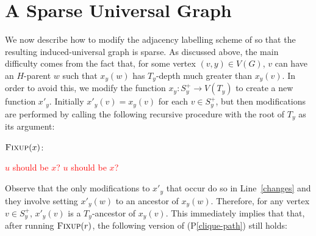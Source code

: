 \documentclass{patmorin}
\newcommand{\pref}[1]{(P\ref{#1})}
\begin{document}
\section{A Sparse Universal Graph}
\label{modifications}

We now describe how to modify the adjacency labelling scheme of \citet{dujmovic.esperet.ea:adjacency} so that the resulting induced-universal graph is sparse.  As discussed above, the main difficulty comes from the fact that, for some vertex $(v,y)\in V(G)$, $v$ can have an $H$-parent $w$ such that $x_y(w)$ has $T_y$-depth much greater than $x_y(v)$.  In order to avoid this, we modify the function $x_y:S^+_y\to V(T_y)$ to create a new function $x'_y$. Initially $x'_y(v)=x_y(v)$ for each $v\in S^+_y$, but then modifications are performed by calling the following recursive procedure with the root of $T_y$ as its argument:

\noindent
\begin{minipage}{\textwidth}
    $\textsc{Fixup}(x)$:
    \begin{algorithmic}[1]
                \ENDIF
            \ENDFOR
        \ENDFOR
         \textcolor{red}{$u$ should be $x$?}
         \textcolor{red}{$u$ should be $x$?}
    \end{algorithmic}
\end{minipage}


Observe that the only modifications to $x'_y$ that occur do so in Line~\ref{changes} and they involve setting $x'_y(w)$ to an ancestor of $x_y(w)$.  Therefore, for any vertex $v\in S^+_y$, $x'_y(v)$ is a $T_y$-ancestor of $x_y(v)$.  This immediately implies that that, after running $\textsc{Fixup}(r)$, the following version of \pref{clique-path} still holds:
\end{document}
